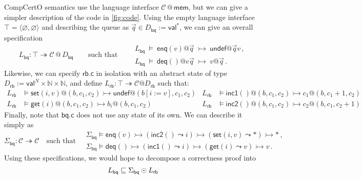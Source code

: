\documentclass[acmsmall,screen,review,anonymous]{acmart}
\newcommand{\kw}[1]{\ensuremath{ \mathsf{#1} }}
\begin{document}
\begin{example} \label{ex:abspec} %
CompCertO semantics use the language interface
$\mathcal{C} \mathbin@ \kw{mem}$,
but we can give
a simpler description of the code in \autoref{fig:code}.
Using the empty language interface $\top = \langle \varnothing, \varnothing \rangle$
and describing the queue as $\vec{q} \in D_\kw{bq} := \kw{val}^*$,
we can give an overall specification
\[
  L_\kw{bq} : \top \twoheadrightarrow \mathcal{C} \mathbin@ D_\kw{bq}
  \qquad
  \text{such that}
  \qquad
  \begin{array}{l}
    L_\kw{bq} \:\vDash\:
      \kw{enq}(v) @ \vec{q}
      \:\rightarrowtail\:
      \kw{undef} @ \vec{q}v
      \,,
    \\
    L_\kw{bq} \:\vDash\:
      \kw{deq}() @ v\vec{q}
      \:\rightarrowtail\:
      v @ \vec{q}
      \,.
  \end{array}
\]
Likewise, we can specify $\kw{rb.c}$ in isolation
with an abstract state of type
$D_\kw{rb} := \kw{val}^N \times \mathbb{N} \times \mathbb{N}$,
and define
$L_\kw{rb} : \top \twoheadrightarrow \mathcal{C}@D_\kw{rb}$
such that:
{%
\begin{align*}
  L_\kw{rb} &\vDash
    \kw{set}(i, v)@(b, c_1, c_2) \rightarrowtail
    \kw{undef}@(b[i := v], c_1, c_2) &
  L_\kw{rb} &\vDash
    \kw{inc1}()@(b, c_1, c_2) \rightarrowtail
    c_1@(b, c_1\!\!+\!\!1, c_2) \\
  L_\kw{rb} &\vDash
    \kw{get}(i)@(b, c_1, c_2) \rightarrowtail
    b_i@(b, c_1, c_2) &
  L_\kw{rb} &\vDash
    \kw{inc2}()@(b, c_1, c_2) \rightarrowtail
    c_2@(b, c_1, c_2\!\!+\!\!1)
\end{align*}
}
Finally,
note that $\kw{bq.c}$ does not use any state of its own.
We can describe it simply as
\[
  \Sigma_\kw{bq} : \mathcal{C} \twoheadrightarrow \mathcal{C}
  \quad\text{such that}\quad
  \begin{array}{l}
    \Sigma_\kw{bq} \vDash
      \kw{enq}(v) \rightarrowtail
      (\kw{inc2}() \leadsto i) \rightarrowtail
      (\kw{set}(i, v) \leadsto *) \rightarrowtail
      * \,,
    \\
    \Sigma_\kw{bq} \vDash
      \kw{deq}() \rightarrowtail
      (\kw{inc1}() \leadsto i) \rightarrowtail
      (\kw{get}(i) \leadsto v) \rightarrowtail
      v \,.
  \end{array}
\]
Using these specifications,
we would hope to decompose a correctness proof into
\[
  \begin{prooftree}
    \hypo{L_\kw{bq} \sqsubseteq \Sigma_\kw{bq} \odot L_\kw{rb}}

\end{prooftree}\]
\end{example}
\end{document}
